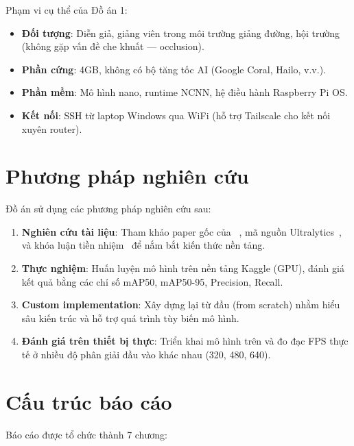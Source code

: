 Phạm vi cụ thể của Đồ án 1:
\begin{itemize}
    \item \textbf{Đối tượng}: Diễn giả, giảng viên trong môi trường giảng đường, hội trường (không gặp vấn đề che khuất --- occlusion).
    \item \textbf{Phần cứng}: \rpi 4GB, không có bộ tăng tốc AI (Google Coral, Hailo, v.v.).
    \item \textbf{Phần mềm}: Mô hình \yolo nano, runtime NCNN, hệ điều hành Raspberry Pi OS.
    \item \textbf{Kết nối}: SSH từ laptop Windows qua WiFi (hỗ trợ Tailscale cho kết nối xuyên router).
\end{itemize}

\section{Phương pháp nghiên cứu}
\label{sec:intro_methodology}

Đồ án sử dụng các phương pháp nghiên cứu sau:

\begin{enumerate}[label=\arabic*)]
    \item \textbf{Nghiên cứu tài liệu}: Tham khảo paper gốc của \yolo~\cite{yolo26}, mã nguồn Ultralytics~\cite{ultralytics}, và khóa luận tiền nhiệm~\cite{kltn_tiennhiem} để nắm bắt kiến thức nền tảng.
    
    \item \textbf{Thực nghiệm}: Huấn luyện mô hình trên nền tảng Kaggle (GPU), đánh giá kết quả bằng các chỉ số mAP50, mAP50-95, Precision, Recall.
    
    \item \textbf{Custom implementation}: Xây dựng lại \yolo từ đầu (from scratch) nhằm hiểu sâu kiến trúc và hỗ trợ quá trình tùy biến mô hình.
    
    \item \textbf{Đánh giá trên thiết bị thực}: Triển khai mô hình trên \rpi và đo đạc FPS thực tế ở nhiều độ phân giải đầu vào khác nhau (320, 480, 640).
\end{enumerate}

\section{Cấu trúc báo cáo}
\label{sec:intro_structure}

Báo cáo được tổ chức thành 7 chương:

